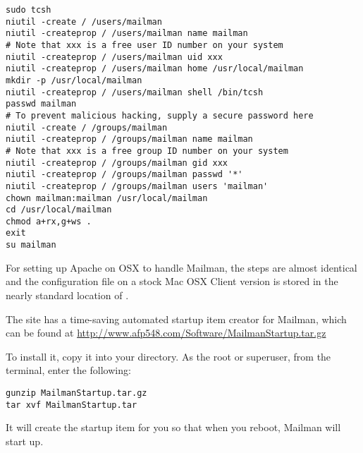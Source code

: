 \documentclass{howto}
\begin{document}
\begin{verbatim}
sudo tcsh
niutil -create / /users/mailman
niutil -createprop / /users/mailman name mailman
# Note that xxx is a free user ID number on your system
niutil -createprop / /users/mailman uid xxx
niutil -createprop / /users/mailman home /usr/local/mailman
mkdir -p /usr/local/mailman
niutil -createprop / /users/mailman shell /bin/tcsh
passwd mailman
# To prevent malicious hacking, supply a secure password here
niutil -create / /groups/mailman
niutil -createprop / /groups/mailman name mailman
# Note that xxx is a free group ID number on your system
niutil -createprop / /groups/mailman gid xxx
niutil -createprop / /groups/mailman passwd '*'
niutil -createprop / /groups/mailman users 'mailman'
chown mailman:mailman /usr/local/mailman
cd /usr/local/mailman
chmod a+rx,g+ws .
exit
su mailman
\end{verbatim}

For setting up Apache on OSX to handle Mailman, the steps are almost identical
and the configuration file on a stock Mac OSX Client version is stored in the
nearly standard location of .

The  site has a time-saving automated startup item creator for
Mailman, which can be found at 
\url{http://www.afp548.com/Software/MailmanStartup.tar.gz}

To install it, copy it into your  directory. As
the root or superuser, from the terminal, enter the following:

\begin{verbatim}
gunzip MailmanStartup.tar.gz
tar xvf MailmanStartup.tar
\end{verbatim}

It will create the startup item for you so that when you reboot, Mailman will
start up.
\end{document}

